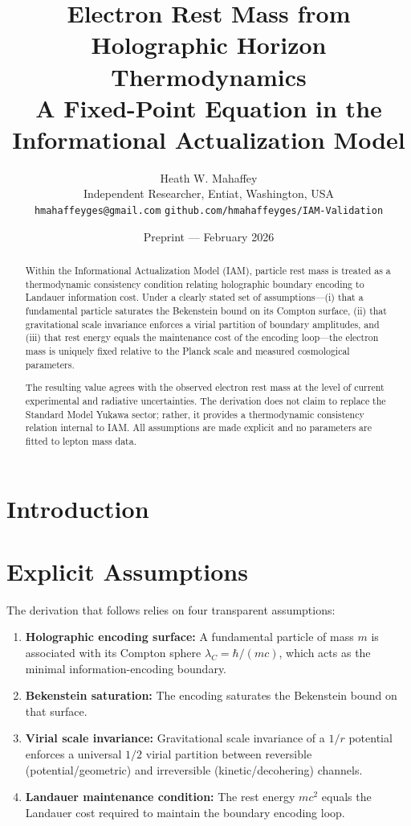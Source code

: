 \documentclass[12pt,a4paper]{article}
\title{\textbf{Electron Rest Mass from Holographic Horizon Thermodynamics}\\[0.5em]
\large A Fixed-Point Equation in the Informational Actualization Model}
\author{Heath W. Mahaffey\\
\small Independent Researcher, Entiat, Washington, USA\\
\small \texttt{hmahaffeyges@gmail.com}
\quad \texttt{github.com/hmahaffeyges/IAM-Validation}}
\date{Preprint --- February 2026}
\begin{document}
\maketitle


\begin{abstract}
Within the Informational Actualization Model (IAM), particle rest mass is treated 
as a thermodynamic consistency condition relating holographic boundary encoding 
to Landauer information cost. Under a clearly stated set of assumptions—(i) that 
a fundamental particle saturates the Bekenstein bound on its Compton surface, 
(ii) that gravitational scale invariance enforces a virial partition of boundary 
amplitudes, and (iii) that rest energy equals the maintenance cost of the encoding 
loop—the electron mass is uniquely fixed relative to the Planck scale and measured 
cosmological parameters. 

The resulting value agrees with the observed electron rest mass at the level of 
current experimental and radiative uncertainties. The derivation does not claim 
to replace the Standard Model Yukawa sector; rather, it provides a thermodynamic 
consistency relation internal to IAM. All assumptions are made explicit and no 
parameters are fitted to lepton mass data.
\end{abstract}


\tableofcontents
\newpage

\section{Introduction}

\section{Explicit Assumptions}

The derivation that follows relies on four transparent assumptions:

\begin{enumerate}
\item \textbf{Holographic encoding surface:} A fundamental particle of mass $m$ 
is associated with its Compton sphere $\lambda_C = \hbar/(mc)$, which acts as 
the minimal information-encoding boundary.
\item \textbf{Bekenstein saturation:} The encoding saturates the Bekenstein bound 
on that surface.
\item \textbf{Virial scale invariance:} Gravitational scale invariance of a 
$1/r$ potential enforces a universal $1/2$ virial partition between reversible 
(potential/geometric) and irreversible (kinetic/decohering) channels.
\item \textbf{Landauer maintenance condition:} The rest energy $mc^2$ equals the 
Landauer cost required to maintain the boundary encoding loop.
\end{enumerate}
\end{document}
